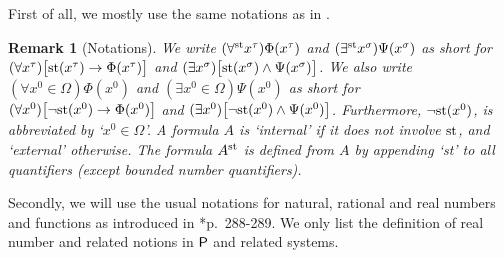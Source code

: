 \documentclass[reqno]{amsart}
\newtheorem{rem}[thm]{Remark}
\def\P{\textup{\textsf{P}}}
\def\st{\textup{st}}
\def\di{\rightarrow}
\numberwithin{equation}{section}
\numberwithin{thm}{section}
\begin{document}
First of all, we mostly use the same notations as in \cite{brie}.  %
\begin{rem}[Notations]\label{notawin}\rm
We write $(\forall^{\st}x^{\tau})\Phi(x^{\tau})$ and $(\exists^{\st}x^{\sigma})\Psi(x^{\sigma})$ as short for 
$(\forall x^{\tau})\big[\st(x^{\tau})\di \Phi(x^{\tau})\big]$ and $(\exists x^{\sigma})\big[\st(x^{\sigma})\wedge \Psi(x^{\sigma})\big]$.     
We also write $(\forall x^{0}\in \Omega)\Phi(x^{0})$ and $(\exists x^{0}\in \Omega)\Psi(x^{0})$ as short for 
$(\forall x^{0})\big[\neg\st(x^{0})\di \Phi(x^{0})\big]$ and $(\exists x^{0})\big[\neg\st(x^{0})\wedge \Psi(x^{0})\big]$.  Furthermore, $\neg\st(x^{0})$, is abbreviated by `$x^{0}\in \Omega$'.  %
A formula $A$ is `internal' if it does not involve $\st$, and `external' otherwise.  The formula $A^{\st}$ is defined from $A$ by appending `st' to all quantifiers (except bounded number quantifiers).    
\end{rem}
Secondly, we will use the usual notations for natural, rational and real numbers and functions as introduced in \cite{kohlenbach2}*{p.\ 288-289}. 
We only list the definition of real number and related notions in $\P$ and related systems.
\end{document}
